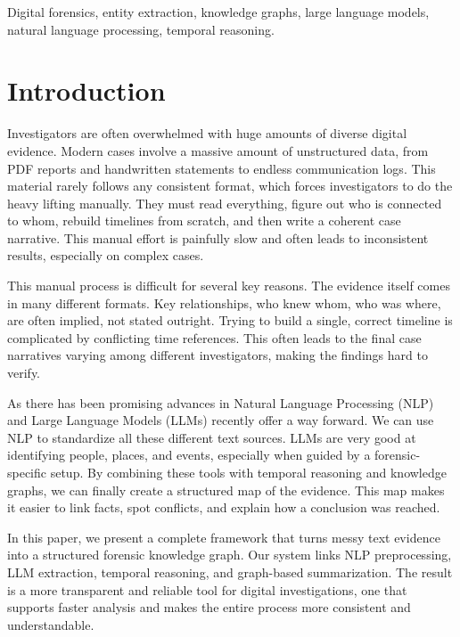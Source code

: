 \documentclass{ieeeaccess}
\begin{document}
\begin{keywords}
Digital forensics, entity extraction, knowledge graphs, large language models, natural language processing, temporal reasoning.
\end{keywords}

\titlepgskip=-15pt
\maketitle

\section{Introduction}
\label{sec:introduction}
Investigators are often overwhelmed with huge amounts of diverse digital evidence. Modern cases involve a massive amount of unstructured data, from PDF reports and handwritten statements to endless communication logs. This material rarely follows any consistent format, which forces investigators to do the heavy lifting manually. They must read everything, figure out who is connected to whom, rebuild timelines from scratch, and then write a coherent case narrative. This manual effort is painfully slow and often leads to inconsistent results, especially on complex cases.

This manual process is difficult for several key reasons. The evidence itself comes in many different formats. Key relationships, who knew whom, who was where, are often implied, not stated outright. Trying to build a single, correct timeline is complicated by conflicting time references. This often leads to the final case narratives varying among different investigators, making the findings hard to verify.

As there has been promising advances in Natural Language Processing (NLP) and Large Language Models (LLMs) recently offer a way forward. We can use NLP to standardize all these different text sources. LLMs are very good at identifying people, places, and events, especially when guided by a forensic-specific setup. By combining these tools with temporal reasoning and knowledge graphs, we can finally create a structured map of the evidence. This map makes it easier to link facts, spot conflicts, and explain how a conclusion was reached.

In this paper, we present a complete framework that turns messy text evidence into a structured forensic knowledge graph. Our system links NLP preprocessing, LLM extraction, temporal reasoning, and graph-based summarization. The result is a more transparent and reliable tool for digital investigations, one that supports faster analysis and makes the entire process more consistent and understandable.
\end{document}
